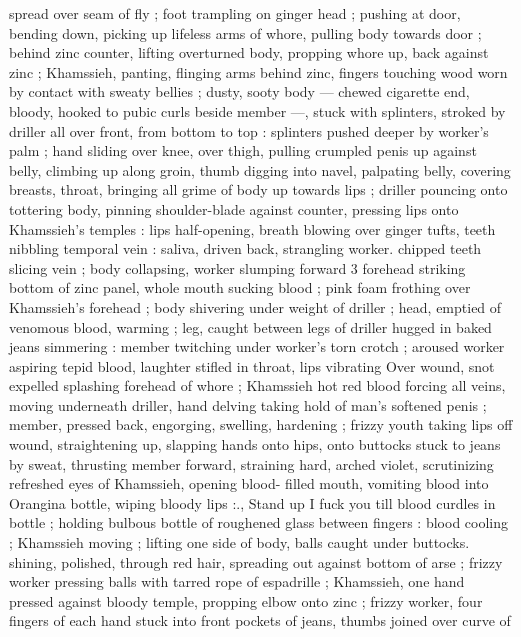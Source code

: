 spread over seam of fly ; foot trampling on ginger head ; pushing at 
door, bending down, picking up lifeless arms of whore, pulling body 
towards door ; behind zinc counter, lifting overturned body, propping 
whore up, back against zinc ; Khamssieh, panting, flinging arms 
behind zinc, fingers touching wood worn by contact with sweaty 
bellies ; dusty, sooty body --- chewed cigarette end, bloody, hooked 
to pubic curls beside member ---, stuck with splinters, stroked by 
driller all over front, from bottom to top : splinters pushed deeper by 
worker's palm ; hand sliding over knee, over thigh, pulling crumpled 
penis up against belly, climbing up along groin, thumb digging into 
navel, palpating belly, covering breasts, throat, bringing all grime of 
body up towards lips ; driller pouncing onto tottering body, pinning 
shoulder-blade against counter, pressing lips onto Khamssieh's 
temples : lips half-opening, breath blowing over ginger tufts, teeth 
nibbling temporal vein : saliva, driven back, strangling worker. 
chipped teeth slicing vein ; body collapsing, worker slumping forward 
3 forehead striking bottom of zinc panel, whole mouth sucking blood 
; pink foam frothing over Khamssieh's forehead ; body shivering 
under weight of driller ; head, emptied of venomous blood, warming 
; leg, caught between legs of driller hugged in baked jeans 
simmering : member twitching under worker's torn crotch ; aroused 
worker aspiring tepid blood, laughter stifled in throat, lips vibrating 
Over wound, snot expelled splashing forehead of whore ; Khamssieh 
hot red blood forcing all veins, moving underneath driller, hand 
delving taking hold of man's softened penis ; member, pressed back, 
engorging, swelling, hardening ; frizzy youth taking lips off wound, 
straightening up, slapping hands onto hips, onto buttocks stuck to 
jeans by sweat, thrusting member forward, straining hard, arched 
violet, scrutinizing refreshed eyes of Khamssieh, opening blood- 
filled mouth, vomiting blood into Orangina bottle, wiping bloody lips 
:{\gl}., Stand up{\td} I fuck you till blood curdles in bottle{\thd} ; holding 
bulbous bottle of roughened glass between fingers : blood cooling ; 
Khamssieh moving ; lifting one side of body, balls caught under 
buttocks. shining, polished, through red hair, spreading out against 
bottom of arse ; frizzy worker pressing balls with tarred rope of 
espadrille ; Khamssieh, one hand pressed against bloody temple, 
propping elbow onto zinc ; frizzy worker, four fingers of each hand 
stuck into front pockets of jeans, thumbs joined over curve of 
